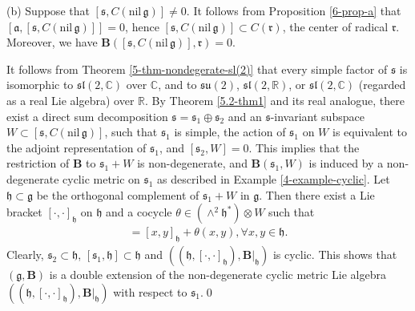 \documentclass[reqno]{amsart}
\theoremstyle{definition}
\begin{document}
(b) Suppose that $[\mathfrak{s},C(\mathrm{nil}\,\mathfrak{g})]\neq0$. It follows from Proposition \ref{6-prop-a}  that $[\mathfrak{a},[\mathfrak{s},C(\mathrm{nil}\,\mathfrak{g})]]=0$,
hence $[\mathfrak{s},C(\mathrm{nil}\,\mathfrak{g})]\subset C(\mathfrak{r})$, the center of radical $\mathfrak{r}$.
Moreover, we have $\mathbf{B}([\mathfrak{s},C(\mathrm{nil}\,\mathfrak{g})],\mathfrak{r})=0$.

It follows from Theorem \ref{5-thm-nondegerate-sl(2)} that every simple factor of $\mathfrak{s}$ is isomorphic to $\mathfrak{sl}(2,\mathbb{C})$ over $\mathbb{C}$, and  to $\mathfrak{su}(2)$, $\mathfrak{sl}(2,\mathbb{R})$, or $\mathfrak{sl}(2,\mathbb{C})$ (regarded as a real Lie algebra) over $\mathbb{R}$.
By Theorem \ref{5.2-thm1} and its real analogue, there exist a direct sum decomposition $\mathfrak{s}=\mathfrak{s}_{1}\oplus\mathfrak{s}_{2}$ and an $\mathfrak{s}$-invariant subspace
$W\subset [\mathfrak{s},C(\mathrm{nil}\,\mathfrak{g})]$, such that $\mathfrak{s}_{1}$ is simple,  the action of  $\mathfrak{s}_{1}$  on  $W$ is equivalent to the adjoint representation of $\mathfrak{s}_{1}$, and $[\mathfrak{s}_{2},W]=0$.
This implies that the restriction of $\mathbf{B}$ to $\mathfrak{s}_{1}+W$ is non-degenerate,
 and $\mathbf{B}(\mathfrak{s}_{1},W)$ is induced by a non-degenerate cyclic metric on $\mathfrak{s}_{1}$ as described in Example \ref{4-example-cyclic}.
 Let $\mathfrak{h}\subset \mathfrak{g}$ be the orthogonal complement of $\mathfrak{s}_{1}+W$ in $\mathfrak{g}$. Then there exist a Lie bracket $[\cdot,\cdot]_{\mathfrak{h}}$ on $\mathfrak{h}$ and a cocycle $\theta\in (\wedge^{2}\mathfrak{h}^{\ast})\otimes W$ such that
\begin{eqnarray*}
[x,y]=[x,y]_{\mathfrak{h}}+\theta(x,y), \forall x,y\in\mathfrak{h}.
\end{eqnarray*}
Clearly, $\mathfrak{s}_{2}\subset \mathfrak{h}$, $[\mathfrak{s}_{1},\mathfrak{h}]\subset \mathfrak{h}$
and $\left((\mathfrak{h},[\cdot,\cdot]_{\mathfrak{h}}),\mathbf{B}|_{\mathfrak{h}}\right)$ is cyclic.
This shows that $(\mathfrak{g},\mathbf{B})$ is a double extension of the non-degenerate  cyclic metric Lie algebra $\left((\mathfrak{h},[\cdot,\cdot]_{\mathfrak{h}}),\mathbf{B}|_{\mathfrak{h}}\right)$ with respect to $\mathfrak{s}_{1}$.\qed




\end{document}
